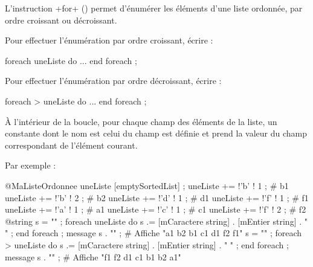 L'instruction \ggs+for+ () permet d'énumérer les éléments d'une liste ordonnée, par ordre croissant ou décroissant.

Pour effectuer l'énumération par ordre croissant, écrire :
\begin{galgascode}
foreach uneListe do
  ...
end foreach ;
\end{galgascode}

Pour effectuer l'énumération par ordre décroissant, écrire :
\begin{galgascode}
foreach > uneListe do
  ...
end foreach ;
\end{galgascode}

À l'intérieur de la boucle, pour chaque champ des éléments de la liste, un constante dont le nom est celui du champ est définie et prend la valeur du champ correspondant de l'élément courant.

Par exemple :

\begin{galgascode}
@MaListeOrdonnee uneListe [emptySortedList] ;
uneListe += !'b' ! 1 ; # b1
uneListe += !'b' ! 2 ; # b2
uneListe += !'d' ! 1 ; # d1
uneListe += !'f' ! 1 ; # f1
uneListe += !'a' ! 1 ; # a1
uneListe += !'c' ! 1 ; # c1
uneListe += !'f' ! 2 ; # f2
@string s = "" ;
foreach uneListe do
  s .= [mCaractere string] . [mEntier string] . " " ;
end foreach ;
message s . "\n" ; # Affiche "a1 b2 b1 c1 d1 f2 f1"
s = "" ;
foreach > uneListe do
  s .= [mCaractere string] . [mEntier string] . " " ;
end foreach ;
message s . "\n" ; # Affiche "f1 f2 d1 c1 b1 b2 a1"
\end{galgascode}
